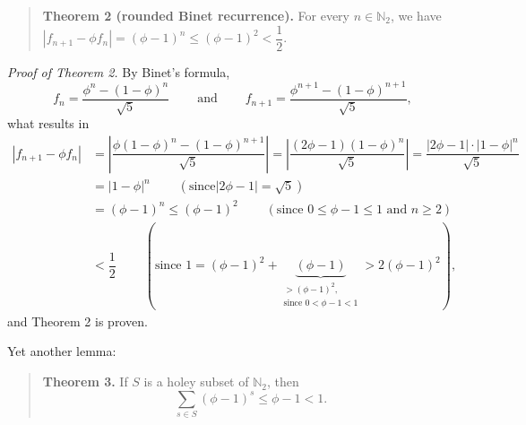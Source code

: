 \documentclass[12pt,final,notitlepage,onecolumn]{article}%
\begin{document}
\begin{quote}
\textbf{Theorem 2 (rounded Binet recurrence).} For every $n\in\mathbb{N}_{2}$,
we have $\left\vert f_{n+1}-\phi f_{n}\right\vert =\left(  \phi-1\right)
^{n}\leq\left(  \phi-1\right)  ^{2}<\dfrac{1}{2}$.
\end{quote}

\textit{Proof of Theorem 2.} By Binet's formula,%
\[
f_{n}=\dfrac{\phi^{n}-\left(  1-\phi\right)  ^{n}}{\sqrt{5}}%
\ \ \ \ \ \ \ \ \ \ \text{and}\ \ \ \ \ \ \ \ \ \ f_{n+1}=\dfrac{\phi
^{n+1}-\left(  1-\phi\right)  ^{n+1}}{\sqrt{5}},
\]
what results in%
\begin{align*}
\left\vert f_{n+1}-\phi f_{n}\right\vert  &  =\left\vert \dfrac{\phi\left(
1-\phi\right)  ^{n}-\left(  1-\phi\right)  ^{n+1}}{\sqrt{5}}\right\vert
=\left\vert \dfrac{\left(  2\phi-1\right)  \left(  1-\phi\right)  ^{n}}%
{\sqrt{5}}\right\vert =\dfrac{\left\vert 2\phi-1\right\vert \cdot\left\vert
1-\phi\right\vert ^{n}}{\sqrt{5}}\\
&  =\left\vert 1-\phi\right\vert ^{n}\ \ \ \ \ \ \ \ \ \ \left(  \text{since
}\left\vert 2\phi-1\right\vert =\sqrt{5}\right) \\
&  =\left(  \phi-1\right)  ^{n}\leq\left(  \phi-1\right)  ^{2}%
\ \ \ \ \ \ \ \ \ \ \left(  \text{since }0\leq\phi-1\leq1\text{ and }%
n\geq2\right) \\
&  <\dfrac{1}{2}\ \ \ \ \ \ \ \ \ \ \left(  \text{since }1=\left(
\phi-1\right)  ^{2}+\underbrace{\left(  \phi-1\right)  }_{\substack{>\left(
\phi-1\right)  ^{2},\\\text{since }0<\phi-1<1}}>2\left(  \phi-1\right)
^{2}\right)  ,
\end{align*}
and Theorem 2 is proven.

Yet another lemma:

\begin{quote}
\textbf{Theorem 3.} If $S$ is a holey subset of $\mathbb{N}_{2}$, then%
\[
\sum_{s\in S}\left(  \phi-1\right)  ^{s}\leq\phi-1<1.
\]



\end{quote}
\end{document}
